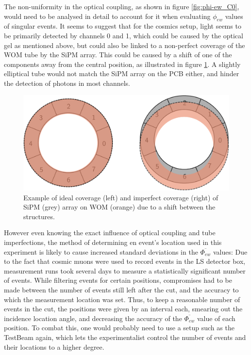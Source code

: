     The non-uniformity in the optical coupling, as shown in figure \ref{fig:phi-ew_C0}, would need to be analysed in detail to account for it when evaluating $\phi_{ew}$ values of singular events. It seems to suggest that for the cosmics setup, light seems to be primarily detected by channels 0 and 1, which could be caused by the optical gel as mentioned above, but could also be linked to a non-perfect coverage of the \ac{WOM} tube by the \ac{SiPM} array. This could be caused by a shift of one of the components away from the central position, as illustrated in figure \ref{fig:wom-shift}. A slightly elliptical tube would not match the \ac{SiPM} array on the \ac{PCB} either, and hinder the detection of photons in most channels.
    
    \begin{figure}[h]
    	\centering
    	\includegraphics[width=.7\textwidth]{pictures/coverage.pdf}
    	\caption{Example of ideal coverage (left) and imperfect coverage (right) of \ac{SiPM} (grey) array on \ac{WOM} (orange) due to a shift between the structures.}
    	\label{fig:wom-shift}
    \end{figure}
    
    However even knowing the exact influence of optical coupling and tube imperfections, the method of determining en event's location used in this experiment is likely to cause increased standard deviations in the $\overline{\Phi_{ew}}$ values: Due to the fact that cosmic muons were used to record events in the \ac{LS} detector box, measurement runs took several days to measure a statistically significant number of events. While filtering events for certain positions, compromises had to be made between the number of events still left after the cut, and the accuracy to which the measurement location was set. Thus, to keep a reasonable number of events in the cut, the positions were given by an interval each, smearing out the incidence location angle, and decreasing the accuracy of the $\overline{\Phi_{ew}}$ value of each position. To combat this, one would probably need to use a setup such as the TestBeam again, which lets the experimentalist control the number of events and their locations to a higher degree.
    
